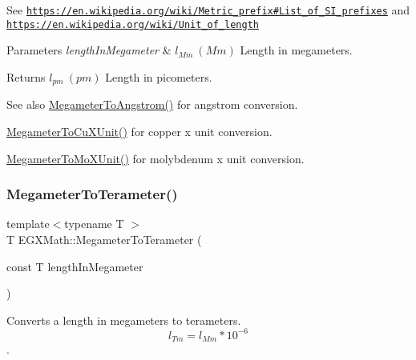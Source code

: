 See \href{https://en.wikipedia.org/wiki/Metric_prefix#List_of_SI_prefixes}{\tt https\+://en.\+wikipedia.\+org/wiki/\+Metric\+\_\+prefix\#\+List\+\_\+of\+\_\+\+S\+I\+\_\+prefixes} and \href{https://en.wikipedia.org/wiki/Unit_of_length}{\tt https\+://en.\+wikipedia.\+org/wiki/\+Unit\+\_\+of\+\_\+length} 
\begin{DoxyParams}{Parameters}
{\em length\+In\+Megameter} & $ l_{Mm}\ (Mm)$ Length in megameters. \\
\hline
\end{DoxyParams}
\begin{DoxyReturn}{Returns}
$ l_{pm}\ (pm)$ Length in picometers. 
\end{DoxyReturn}
\begin{DoxySeeAlso}{See also}
\mbox{\hyperlink{group___e_g_x_math-_conversions-_length_conversions-_megameter-_non-_s_i_gac4c7e615f4ec3d000ac341a5bf9a79a0}{Megameter\+To\+Angstrom()}} for angstrom conversion. 

\mbox{\hyperlink{group___e_g_x_math-_conversions-_length_conversions-_megameter-_non-_s_i_gae44ce2fd3e740a5aec1546ed10c83447}{Megameter\+To\+Cu\+X\+Unit()}} for copper x unit conversion. 

\mbox{\hyperlink{group___e_g_x_math-_conversions-_length_conversions-_megameter-_non-_s_i_ga134a9fb2603b93c739c4ee58864f69c6}{Megameter\+To\+Mo\+X\+Unit()}} for molybdenum x unit conversion. 
\end{DoxySeeAlso}
\mbox{\label{group___e_g_x_math-_conversions-_length_conversions-_megameter-_s_i_ga381dd9fb7b3a0867e03bde8de98ee82e}} 
\subsubsection{\texorpdfstring{Megameter\+To\+Terameter()}{MegameterToTerameter()}}
{\footnotesize\ttfamily template$<$typename T $>$ \\
T E\+G\+X\+Math\+::\+Megameter\+To\+Terameter (\begin{DoxyParamCaption}\item[{const T}]{length\+In\+Megameter }\end{DoxyParamCaption})}



Converts a length in megameters to terameters. \[ l_{Tm}=l_{Mm} * 10^{-6} \]. 

